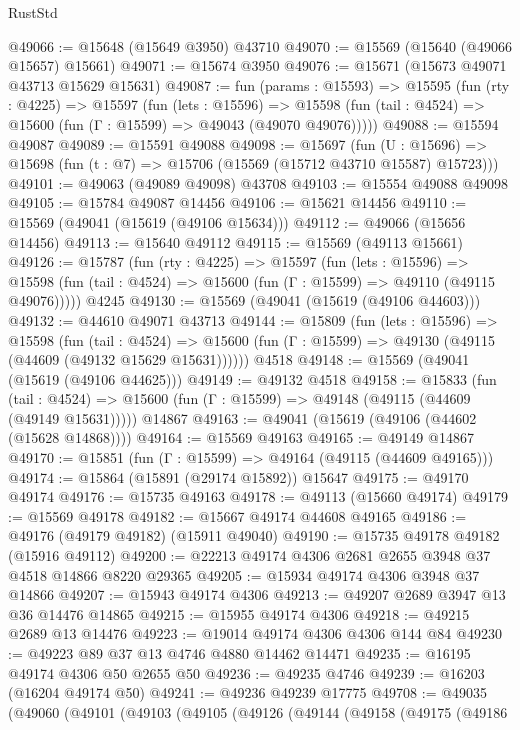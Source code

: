 \begin{lexlean}{RustStd}
\begin{coremodule}
@49066 := @15648 (@15649 @3950) @43710
@49070 := @15569 (@15640 (@49066 @15657) @15661)
@49071 := @15674 @3950
@49076 := @15671 (@15673 @49071 @43713 @15629 @15631)
@49087 := fun (params : @15593) =>
  @15595
    (fun (rty : @4225) =>
    @15597
      (fun (lets : @15596) =>
      @15598 (fun (tail : @4524) => @15600 (fun (Γ : @15599) => @49043 (@49070 @49076)))))
@49088 := @15594 @49087
@49089 := @15591 @49088
@49098 := @15697
    (fun (U : @15696) => @15698 (fun (t : @7) => @15706 (@15569 (@15712 @43710 @15587) @15723)))
@49101 := @49063 (@49089 @49098) @43708
@49103 := @15554 @49088 @49098
@49105 := @15784 @49087 @14456
@49106 := @15621 @14456
@49110 := @15569 (@49041 (@15619 (@49106 @15634)))
@49112 := @49066 (@15656 @14456)
@49113 := @15640 @49112
@49115 := @15569 (@49113 @15661)
@49126 := @15787
    (fun (rty : @4225) =>
    @15597
      (fun (lets : @15596) =>
      @15598 (fun (tail : @4524) => @15600 (fun (Γ : @15599) => @49110 (@49115 @49076)))))
    @4245
@49130 := @15569 (@49041 (@15619 (@49106 @44603)))
@49132 := @44610 @49071 @43713
@49144 := @15809
    (fun (lets : @15596) =>
    @15598
      (fun (tail : @4524) =>
      @15600 (fun (Γ : @15599) => @49130 (@49115 (@44609 (@49132 @15629 @15631))))))
    @4518
@49148 := @15569 (@49041 (@15619 (@49106 @44625)))
@49149 := @49132 @4518
@49158 := @15833
    (fun (tail : @4524) => @15600 (fun (Γ : @15599) => @49148 (@49115 (@44609 (@49149 @15631)))))
    @14867
@49163 := @49041 (@15619 (@49106 (@44602 (@15628 @14868))))
@49164 := @15569 @49163
@49165 := @49149 @14867
@49170 := @15851 (fun (Γ : @15599) => @49164 (@49115 (@44609 @49165)))
@49174 := @15864 (@15891 (@29174 @15892)) @15647
@49175 := @49170 @49174
@49176 := @15735 @49163
@49178 := @49113 (@15660 @49174)
@49179 := @15569 @49178
@49182 := @15667 @49174 @44608 @49165
@49186 := @49176 (@49179 @49182) (@15911 @49040)
@49190 := @15735 @49178 @49182 (@15916 @49112)
@49200 := @22213 @49174 @4306 @2681 @2655 @3948 @37 @4518 @14866 @8220 @29365
@49205 := @15934 @49174 @4306 @3948 @37 @14866
@49207 := @15943 @49174 @4306
@49213 := @49207 @2689 @3947 @13 @36 @14476 @14865
@49215 := @15955 @49174 @4306
@49218 := @49215 @2689 @13 @14476
@49223 := @19014 @49174 @4306 @4306 @144 @84
@49230 := @49223 @89 @37 @13 @4746 @4880 @14462 @14471
@49235 := @16195 @49174 @4306 @50 @2655 @50
@49236 := @49235 @4746
@49239 := @16203 (@16204 @49174 @50)
@49241 := @49236 @49239 @17775
@49708 := @49035
    (@49060
      (@49101
        (@49103
          (@49105
            (@49126
              (@49144
                (@49158
                  (@49175
                    (@49186

\end{coremodule}
\end{lexlean}

